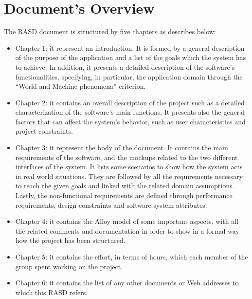 \section{Document's Overview}

The RASD document is structured by five chapters as describes below:\\

\begin{itemize}
	\item Chapter 1: it represent an introduction. It is formed by a general description of the purpose of the application and a list of the goals which the system has to achieve. In addition, it presents a detailed description of the software's functionalities, specifying, in particular, the application domain through the “World and Machine phenomena” criterion.
	\item Chapter 2: it contains an overall description of the project such as a detailed characterization of the software's main functions. It presents also the general factors that can affect the system's behavior, such as user characteristics and project constraints.
	\item Chapter 3: it represent the body of the document. It contains the main requirements of the software, and the mockups related to the two different interfaces of the system. It lists some scenarios to show how the system acts in real world situations. They are followed by all the requirements necessary to reach the given goals and linked with the related domain assumptions. Lastly, the non-functional requirements are defined through performance requirements, design constraints and
	software system attributes.
	\item Chapter 4: it contains the Alloy model of some important aspects, with all the related comments and documentation in order to show in a formal way how the project has been structured.
	\item Chapter 5: it contains the effort, in terms of hours, which each member of the group spent working on the project.
	\item Chapter 6: it contains the list of any other documents or Web addresses to which this RASD refers.
\end{itemize}